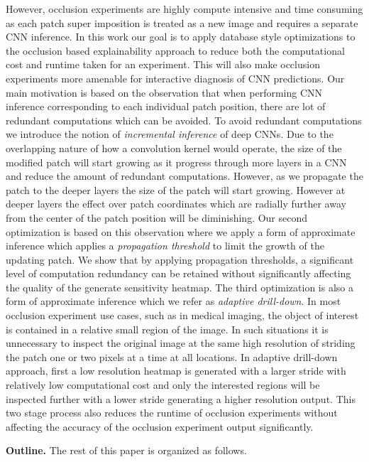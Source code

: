 However, occlusion experiments are highly compute intensive and time consuming as each patch super imposition is treated as a new image and requires a separate CNN inference.
In this work our goal is to apply database style optimizations to the occlusion based explainability approach to reduce both the computational cost and runtime taken for an experiment.
This will also make occlusion experiments more amenable for interactive diagnosis of CNN predictions.
Our main motivation is based on the observation that when performing CNN inference corresponding to each individual patch position, there are lot of redundant computations which can be avoided.
To avoid redundant computations we introduce the notion of \textit{incremental inference} of deep CNNs.
Due to the overlapping nature of how a convolution kernel would operate, the size of the modified patch will start growing as it progress through more layers in a CNN and reduce the amount of redundant computations.
However, as we propagate the patch to the deeper layers the size of the patch will start growing. However at deeper layers the effect over patch coordinates which are radially further away from the center of the patch position will be diminishing.
Our second optimization is based on this observation where we apply a form of approximate inference which applies a \textit{propagation threshold} to limit the growth of the updating patch.
We show that by applying propagation thresholds, a significant level of computation redundancy can be retained without significantly affecting the quality of the generate sensitivity heatmap.
The third optimization is also a form of approximate inference which we refer as \textit{adaptive drill-down}.
In most occlusion experiment use cases, such as in medical imaging, the object of interest is contained in a relative small region of the image.
In such situations it is unnecessary to inspect the original image at the same high resolution of striding the patch one or two pixels at a time at all locations.
In adaptive drill-down approach, first a low resolution heatmap is generated with a larger stride with relatively low computational cost and only the interested regions will be inspected further with a lower stride generating a higher resolution output.
This two stage process also reduces the runtime of occlusion experiments without affecting the accuracy of the occlusion experiment output significantly.

\noindent \textbf{Outline.} The rest of this paper is organized as follows.
